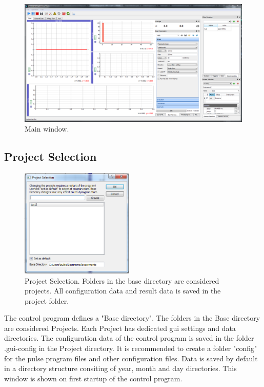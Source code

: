 \documentclass[11pt]{scrartcl}
\begin{document}
\begin{figure}[htbp]
\begin{center}
\includegraphics[width=\textwidth]{MainWindow}
\end{center}
\caption{\label{MainWindow} Main window.}
\end{figure}

\subsection{Project Selection}

\begin{figure}
\centering
\includegraphics[width=0.48\textwidth]{ProjectSelection}
\caption{\label{ProjectSelection} Project Selection. Folders in the base directory are considered projects. All configuration data and result data is saved in the project folder.}
\end{figure}

The control program defines a "Base directory". The folders in the Base directory are considered Projects. Each Project has dedicated gui settings and data directories. The configuration data of the control program is saved in the folder .gui-config in the Project directory. It is recommended to create a folder "config" for the pulse program files and other configuration files. Data is saved by default in a directory structure consiting of year, month and day directories. This window is shown on first startup of the control program.
\end{document}
